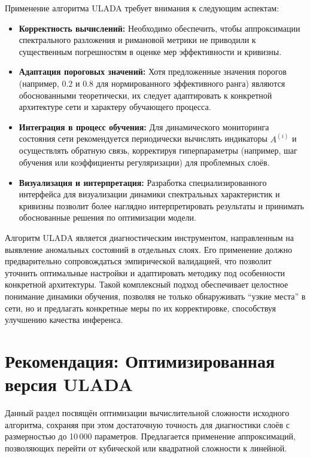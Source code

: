 \documentclass[a4paper,12pt]{article}
\begin{document}
Применение алгоритма ULADA требует внимания к следующим аспектам:
\begin{itemize}[leftmargin=1.5cm]
    \item \textbf{Корректность вычислений:} Необходимо обеспечить, чтобы аппроксимации спектрального разложения и римановой метрики не приводили к существенным погрешностям в оценке мер эффективности и кривизны.
    \item \textbf{Адаптация пороговых значений:} Хотя предложенные значения порогов (например, \(0.2\) и \(0.8\) для нормированного эффективного ранга) являются обоснованными теоретически, их следует адаптировать к конкретной архитектуре сети и характеру обучающего процесса.
    \item \textbf{Интеграция в процесс обучения:} Для динамического мониторинга состояния сети рекомендуется периодически вычислять индикаторы \( A^{(i)} \) и осуществлять обратную связь, корректируя гиперпараметры (например, шаг обучения или коэффициенты регуляризации) для проблемных слоёв.
    \item \textbf{Визуализация и интерпретация:} Разработка специализированного интерфейса для визуализации динамики спектральных характеристик и кривизны позволит более наглядно интерпретировать результаты и принимать обоснованные решения по оптимизации модели.
\end{itemize}

Алгоритм ULADA является диагностическим инструментом, направленным на выявление аномальных состояний в отдельных слоях. Его применение должно предварительно сопровождаться эмпирической валидацией, что позволит уточнить оптимальные настройки и адаптировать методику под особенности конкретной архитектуры. Такой комплексный подход обеспечивает целостное понимание динамики обучения, позволяя не только обнаруживать ``узкие места'' в сети, но и предлагать конкретные меры по их корректировке, способствуя улучшению качества инференса.

\bigskip

\section{Рекомендация: Оптимизированная версия ULADA}

Данный раздел посвящён оптимизации вычислительной сложности исходного алгоритма, сохраняя при этом достаточную точность для диагностики слоёв с размерностью до 10\,000 параметров. Предлагается применение аппроксимаций, позволяющих перейти от кубической или квадратной сложности к линейной.
\end{document}
